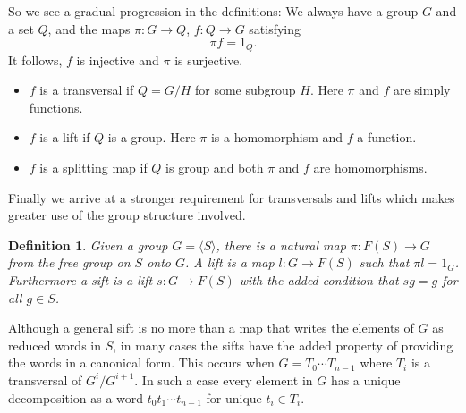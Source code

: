 \documentclass[12pt]{article}
\newtheorem{defn}[thm]{Definition}
\begin{document}
So we see a gradual progression in the definitions:  We always have a group $G$ and a set $Q$, and the maps $\pi:G\rightarrow Q$, $f:Q\rightarrow G$ satisfying
\[ \pi f=1_{Q}.\]
It follows, $f$ is injective and $\pi$ is surjective.
\begin{itemize}
\item $f$ is a transversal if $Q=G/H$ for some subgroup $H$. Here
$\pi$ and $f$ are simply functions.
\item $f$ is a lift if $Q$ is a group.  Here $\pi$ is a homomorphism and
$f$ a function.
\item $f$ is a splitting map if $Q$ is group and both $\pi$ and $f$ are
homomorphisms.
\end{itemize}

Finally we arrive at a stronger requirement for transversals and lifts which makes greater use of the group structure involved.

\begin{defn}
Given a group $G=\langle S\rangle$, there is a natural map
$\pi:F(S)\rightarrow G$ from the free group on $S$ onto $G$.  A \emph{lift}
is a map $l:G\rightarrow F(S)$ such that $\pi l =1_G$.  Furthermore a
\emph{sift} is a lift $s:G\rightarrow F(S)$ with the added condition that
$sg=g$ for all $g\in S$.
\end{defn}

Although a general sift is no more than a map that writes the 
elements of $G$ as reduced words in $S$, in many cases the sifts
have the added property of providing the words in a canonical form.
This occurs when $G=T_0\cdots T_{n-1}$ where $T_i$ is a transversal
of $G^i/G^{i+1}$.  In such a case every element in $G$ has a unique 
decomposition as a word $t_0t_1\cdots t_{n-1}$ for unique $t_i\in T_i$.

\end{document}
